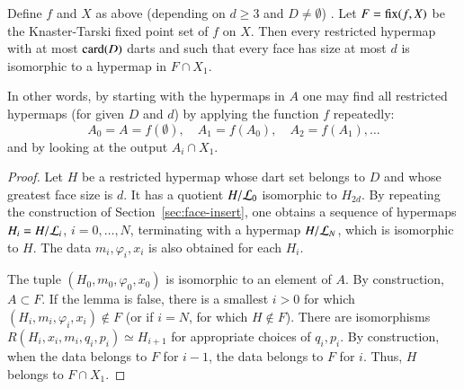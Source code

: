 \begin{lemma}  
Define $f $ and $X$ as above (depending on $d\ge 3$ and $D\ne
\emptyset$) .  Let $F={\operatorname{fix}}(f,X)$ be the Knaster-Tarski fixed
point set of $f$ on $X$.  Then every restricted hypermap with at
most ${\operatorname{card}}(D)$ darts and such that every face has size at most $d$
is isomorphic to a hypermap in $F\cap X_1$.
\end{lemma}
%

In other words, by starting with the  hypermaps in $A$
one may find all restricted hypermaps (for given $D$ and $d$) by
applying the function $f$ repeatedly:
\begin{displaymath}
A_0 = A = f(\emptyset),\quad A_1 = f(A_0),\quad A_2 = f(A_1),\ldots
\end{displaymath}
and by looking at the output $A_i \cap X_1$.
%

\begin{proof} Let $H$ be a restricted hypermap whose dart set belongs
to $D$ and whose greatest face size is $d$.  It has a quotient
$H/{\cal L}_0$ isomorphic to $H_{2d}$.  By repeating the
construction of Section~\ref{sec:face-insert}, one obtains a
sequence of hypermaps $H_i = H/{\cal L}_i$, $i=0,\ldots,N$,
terminating with a hypermap $H/{\cal L}_N$, which is isomorphic to
$H$.  The data $m_i,\varphi_i,x_i$ is also obtained for each $H_i$.

The tuple $(H_0,m_0,\varphi_0,x_0)$ is isomorphic to an element of
$A$.  By construction, $A\subset F$.  If the lemma is false, there
is a smallest $i>0$ for which $(H_i,m_i,\varphi_i,x_i)\not\in F$ (or
if $i=N$, for which $H\not\in F$).  There are isomorphisms
$R(H_i,x_i,m_i,q_i,p_i) \simeq H_{i+1}$ for appropriate choices of
$q_i,p_i$.  By construction, when the data belongs to $F$ for $i-1$,
the data belongs to $F$ for $i$.  Thus, $H$ belongs to $F\cap X_1$.
\end{proof}

